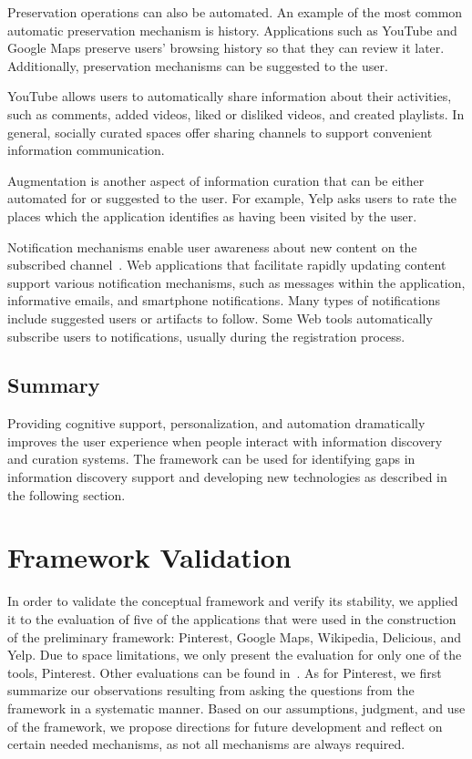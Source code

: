 \documentclass{sigchi}
\newcommand{\feature}[1]{{\ttfamily#1}}
\begin{document}
{{{{Preservation operations can also be automated. An example of the most common automatic preservation mechanism is \feature{history}. Applications such as YouTube and Google Maps preserve users' browsing history so that they can review it later. Additionally, preservation mechanisms can be \feature{suggested} to the user.


YouTube allows users to \feature{automatically share} information about their activities, such as comments,  added videos, liked or disliked videos, and created playlists. In general, socially curated spaces \feature{offer sharing channels} to support convenient information communication.
 
Augmentation is another aspect of information curation that can be either \feature{automated} for or \feature{suggested} to the user. For example, Yelp asks users to rate the places which the application identifies as having been visited by the user. 


Notification mechanisms enable user awareness about new content on the subscribed channel~\cite{millen2005social}. Web applications that facilitate rapidly updating content support various notification mechanisms, such as messages within the application, informative emails, and smartphone notifications. Many types of notifications include suggested users or artifacts to follow. Some Web tools automatically subscribe users to notifications, usually during the registration process.
} %
{\subsection{Summary}
Providing cognitive support, personalization, and automation dramatically improves the user experience when people interact with information discovery and curation systems. The framework can be used for identifying gaps in information discovery support and developing new technologies as described in the following section.  
}
}

\section{Framework Validation}
\label{section:validation}
In order to validate the conceptual framework and verify its stability, we applied it to the evaluation of five of the applications that were used in the construction of the preliminary framework: Pinterest, Google Maps, Wikipedia, Delicious, and Yelp. Due to space limitations, we only present the evaluation for only one of the tools, Pinterest. Other evaluations can be found in~\cite{voyloshnikova2015}. As for Pinterest, we first summarize our observations resulting from asking the questions from the framework in a systematic manner. Based on our assumptions, judgment, and use of the framework, we propose directions for future development and reflect on certain needed mechanisms, as not all mechanisms are always required.  

}}
\end{document}
